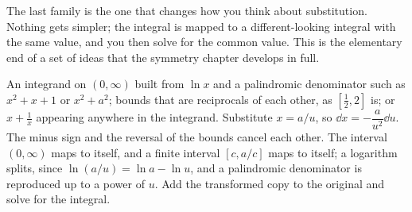 The last family is the one that changes how you think about substitution. Nothing gets simpler; the integral is mapped to a different-looking integral with the same value, and you then solve for the common value. This is the elementary end of a set of ideas that the symmetry chapter develops in full.

\cue An integrand on $(0,\infty)$ built from $\ln x$ and a palindromic denominator such as $x^2+x+1$ or $x^2+a^2$; bounds that are reciprocals of each other, as $[\tfrac12,2]$ is; or $x+\tfrac1x$ appearing anywhere in the integrand.
\method Substitute $x=a/u$, so $\dd x=-\dfrac{a}{u^2}\dd u$. The minus sign and the reversal of the bounds cancel each other. The interval $(0,\infty)$ maps to itself, and a finite interval $[c,a/c]$ maps to itself; a logarithm splits, since $\ln(a/u)=\ln a-\ln u$, and a palindromic denominator is reproduced up to a power of $u$. Add the transformed copy to the original and solve for the integral.

